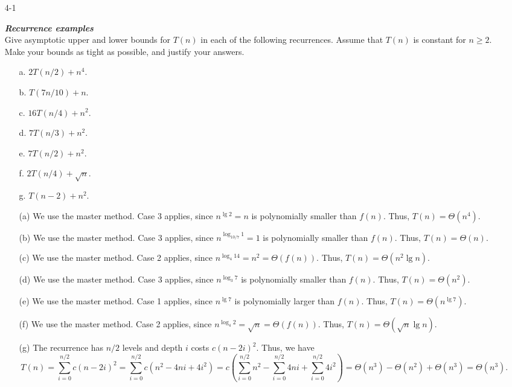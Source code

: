 \documentclass{report}
\makeatletter
\renewenvironment{framed}{%
 \def\FrameCommand##1{\hskip\@totalleftmargin
 \fboxsep=\FrameSep\fbox{##1}}%
 \MakeFramed {\advance\hsize-\width
   \@totalleftmargin\z@ \linewidth\hsize
   \@setminipage}}%
 {\par\unskip\endMakeFramed}
\makeatother
\begin{document}
\begin{enumerate}

\item[4{-}1]{\textbf{\emph{Recurrence examples}}\\
Give asymptotic upper and lower bounds for $T(n)$ in each of the following
recurrences. Assume that $T(n)$ is constant for $n \ge 2$. Make your bounds as
tight as possible, and justify your answers.

\begin{enumerate}
  \item [a.] $2T(n/2) + n^4$.
  \item [b.] $T(7n/10) + n$.
  \item [c.] $16T(n/4) + n^2$.
  \item [d.] $7T(n/3) + n^2$.
  \item [e.] $7T(n/2) + n^2$.
  \item [f.] $2T(n/4) + \sqrt{n}$.
  \item [g.] $T(n - 2) + n^2$.
\end{enumerate}
}

\begin{framed}
\begin{enumerate}
  \item[(a)] We use the master method. Case 3 applies, since $n^{\lg 2} = n$ is
    polynomially smaller than $f(n)$. Thus, $T(n) = \Theta(n^4)$.
  \item[(b)] We use the master method. Case 3 applies, since
    $n^{\log_{10/7} 1} = 1$ is polynomially smaller than $f(n)$. Thus,
    $T(n) = \Theta(n)$.
  \item[(c)] We use the master method. Case 2 applies, since
    $n^{\log_4 14} = n^2 = \Theta(f(n))$. Thus, $T(n) = \Theta(n^2 \lg n)$.
  \item[(d)] We use the master method. Case 3 applies, since $n^{\log_3 7}$ is
    polynomially smaller than $f(n)$. Thus, $T(n) = \Theta(n^2)$.
  \item[(e)] We use the master method. Case 1 applies, since $n^{\lg 7}$ is
    polynomially larger than $f(n)$. Thus, $T(n) = \Theta(n^{\lg 7})$.
  \item[(f)] We use the master method. Case 2 applies, since
    $n^{\log_4 2} = \sqrt n = \Theta(f(n))$. Thus, $T(n) = \Theta(\sqrt n \lg n)$.
  \item[(g)] The recurrence has $n/2$ levels and depth $i$ costs $c(n - 2i)^2$.
    Thus, we have
    \[
      T(n) = \sum_{i = 0}^{n/2} c(n - 2i)^2
           = \sum_{i = 0}^{n/2} c(n^2 - 4ni + 4i^2)
           = c \left(\sum_{i = 0}^{n/2} n^2 - \sum_{i = 0}^{n/2} 4ni + \sum_{i = 0}^{n/2} 4i^2\right)
           = \Theta(n^3) - \Theta(n^2) + \Theta(n^3)
           = \Theta(n^3).
    \]
\end{enumerate}
\end{framed}


\end{enumerate}
\end{document}
